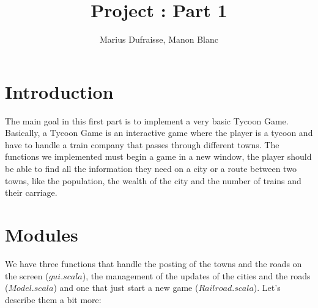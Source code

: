 \documentclass[a4paper]{article}
\title{Project : Part 1}
\author{Marius Dufraisse, Manon Blanc}
\date{ }
\begin{document}
	\maketitle
	\thispagestyle{fancy}
	\section{Introduction}
	
	The main goal in this first part is to implement a very basic Tycoon Game. Basically, a Tycoon Game is an interactive game where the player is a tycoon and have to handle a train company that passes through different towns. The functions we implemented must begin a game in a new window, the player should be able to find all the information they need on a city or a route between two towns, like the population, the wealth of the city and the number of trains and their carriage. 
	
	\section{Modules}
	
	We have three functions that handle the posting of the towns and the roads on the screen ($gui.scala$), the management of the updates of the cities and the roads ($Model.scala$) and one that just start a new game ($Railroad.scala$). Let's describe them a bit more:
	
\end{document}
